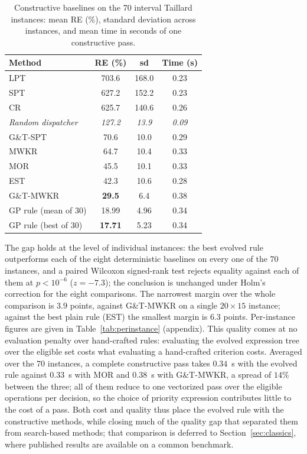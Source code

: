 \documentclass[review,authoryear,11pt]{elsarticle}
\begin{document}
\begin{table}[t]
\centering\small
\caption{Constructive baselines on the 70 interval Taillard instances:
mean RE (\%), standard deviation across instances, and mean time in
seconds of one constructive pass.}
\label{tab:baselines}
\begin{tabular}{lccc}
\toprule
Method & RE (\%) & sd & Time (s) \\
\midrule
LPT & 703.6 & 168.0 & 0.23 \\
SPT & 627.2 & 152.2 & 0.23 \\
CR & 625.7 & 140.6 & 0.26 \\
\midrule
\textit{Random dispatcher} & \textit{127.2} & \textit{13.9} & \textit{0.09} \\
\midrule
G\&T-SPT & 70.6 & 10.0 & 0.29 \\
MWKR & 64.7 & 10.4 & 0.33 \\
MOR & 45.5 & 10.1 & 0.33 \\
EST & 42.3 & 10.6 & 0.28 \\
G\&T-MWKR & \textbf{29.5} & 6.4 & 0.38 \\
\midrule
GP rule (mean of 30) & 18.99 & 4.96 & 0.34 \\
GP rule (best of 30) & \textbf{17.71} & 5.23 & 0.34 \\
\bottomrule
\end{tabular}
\end{table}
The gap holds at the level of individual instances: the best evolved
rule outperforms each of the eight deterministic baselines on every one of
the $70$ instances, and a paired Wilcoxon signed-rank test rejects
equality against each of them at $p<10^{-6}$ ($z=-7.3$); the
conclusion is unchanged under Holm's correction for the eight
comparisons. The narrowest
margin over the whole comparison is $3.9$ points, against G\&T-MWKR on a
single $20{\times}15$ instance; against the best plain rule (EST) the
smallest margin is $6.3$ points. Per-instance figures are given in
Table~\ref{tab:perinstance} (appendix). This quality comes at
no evaluation penalty over hand-crafted rules: evaluating the evolved
expression tree over the eligible set costs what evaluating a
hand-crafted criterion costs. Averaged over the 70 instances, a complete
constructive pass takes $0.34$~s with the evolved rule against
$0.33$~s with MOR and $0.38$~s with G\&T-MWKR, a spread of $14\%$ between the
three; all of them reduce to one vectorized pass over the eligible
operations per decision, so the choice of priority expression
contributes little to the cost of a pass. Both cost and quality thus
place the evolved rule with the constructive methods, while closing much
of the quality gap that separated them from search-based methods; that
comparison is deferred to
Section~\ref{sec:classics}, where published results are available on a
common benchmark.
\end{document}
